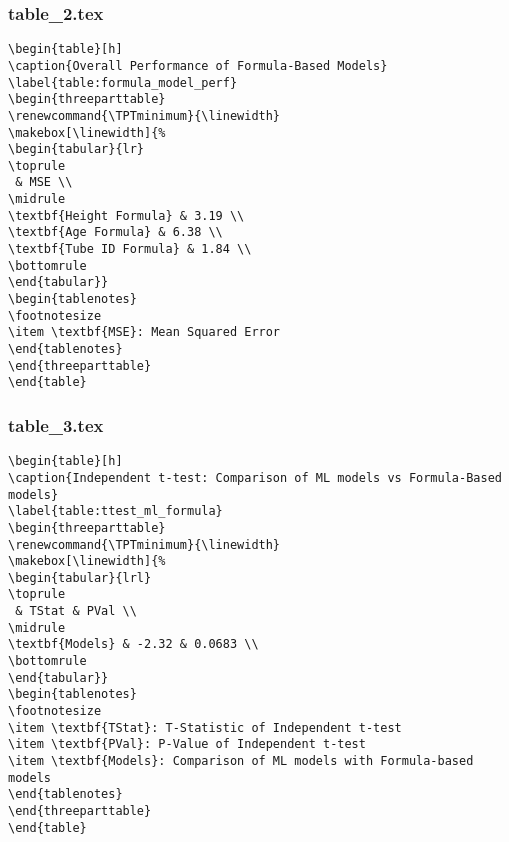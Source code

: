\documentclass[11pt]{article}
\begin{document}
\subsubsection*{table\_2.tex}

\begin{Verbatim}[tabsize=4]
\begin{table}[h]
\caption{Overall Performance of Formula-Based Models}
\label{table:formula_model_perf}
\begin{threeparttable}
\renewcommand{\TPTminimum}{\linewidth}
\makebox[\linewidth]{%
\begin{tabular}{lr}
\toprule
 & MSE \\
\midrule
\textbf{Height Formula} & 3.19 \\
\textbf{Age Formula} & 6.38 \\
\textbf{Tube ID Formula} & 1.84 \\
\bottomrule
\end{tabular}}
\begin{tablenotes}
\footnotesize
\item \textbf{MSE}: Mean Squared Error
\end{tablenotes}
\end{threeparttable}
\end{table}

\end{Verbatim}

\subsubsection*{table\_3.tex}

\begin{Verbatim}[tabsize=4]
\begin{table}[h]
\caption{Independent t-test: Comparison of ML models vs Formula-Based models}
\label{table:ttest_ml_formula}
\begin{threeparttable}
\renewcommand{\TPTminimum}{\linewidth}
\makebox[\linewidth]{%
\begin{tabular}{lrl}
\toprule
 & TStat & PVal \\
\midrule
\textbf{Models} & -2.32 & 0.0683 \\
\bottomrule
\end{tabular}}
\begin{tablenotes}
\footnotesize
\item \textbf{TStat}: T-Statistic of Independent t-test
\item \textbf{PVal}: P-Value of Independent t-test
\item \textbf{Models}: Comparison of ML models with Formula-based models
\end{tablenotes}
\end{threeparttable}
\end{table}

\end{Verbatim}




\end{document}
